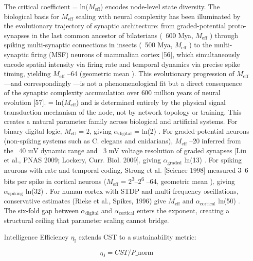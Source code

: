 \documentclass[a4paper,12pt]{article}
\begin{document}
The critical coefficient  \alpha  = ln($M_{\text{eff}}$) encodes node-level state diversity.
The biological basis for $M_{\text{eff}}$ scaling with neural complexity has been illuminated by the evolutionary trajectory of synaptic architecture: from graded-potential proto-synapses in the last common ancestor of bilaterians (~600 Mya, $M_{\text{eff}}$  ) through spiking multi-synaptic connections in insects (~500 Mya, $M_{\text{eff}}$  ) to the multi-synaptic firing
(MSF) neurons of mammalian cortex [56], which simultaneously encode spatial intensity via firing rate and temporal dynamics via precise spike timing, yielding $M_{\text{eff}}$  --64 (geometric mean  ).
This evolutionary progression of $M_{\text{eff}}$---and correspondingly  \alpha ---is not a phenomenological fit but a direct consequence of the synaptic complexity accumulation over 600 million years of neural evolution [57].  \alpha  = ln($M_{\text{eff}}$) and is determined entirely by the physical signal transduction mechanism of the node, not by network topology or training.
This creates a natural parameter family across biological and artificial systems.
For binary digital logic, $M_{\text{eff}}$ = 2, giving $\alpha_{\text{digital}}$ = ln(2)  .
For graded-potential neurons (non-spiking systems such as C. elegans and cnidarians), $M_{\text{eff}}$  --20 inferred from the ~40 mV dynamic range and ~3 mV voltage resolution of graded synapses [Liu et al., PNAS 2009; Lockery, Curr.
Biol. 2009], giving $\alpha_{\text{graded}}$  \approx  ln(13)  .
For spiking neurons with rate and temporal coding, Strong et al. [Science 1998] measured 3--6 bits per spike in cortical neurons ($M_{\text{eff}}$ = 2\textsuperscript{3}--2\textsuperscript{6}  --64, geometric mean  ), giving $\alpha_{\text{spiking}}$  \approx  ln(32)  .
For human cortex with STDP and multi-frequency oscillations, conservative estimates (Rieke et al., Spikes, 1996) give $M_{\text{eff}}$   and $\alpha_{\text{cortical}}$  \approx  ln(50)  .
The six-fold gap between $\alpha_{\text{digital}}$ and $\alpha_{\text{cortical}}$ enters the exponent, creating a structural ceiling that parameter scaling cannot bridge.

Intelligence Efficiency $\eta_{\text{I}}$ extends CST to a sustainability metric:

\begin{equation}
\eta_I = CST / P\_{\text{norm}} \tag{5}
\end{equation}
\end{document}
